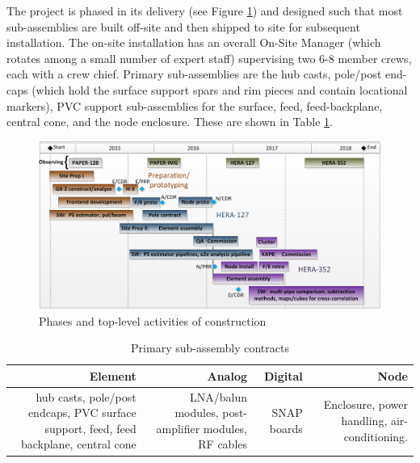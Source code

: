 \documentclass[preprint]{aastex}
\begin{document}
The project is phased in its delivery (see Figure \ref{fig:scheduleSummary}) and
designed such that most sub-assemblies are built off-site and then shipped to site
for subsequent installation. The on-site installation has an overall On-Site Manager
(which rotates among a small number of expert staff) supervising two 6-8 member
crews, each with a crew chief. Primary sub-assemblies are the hub casts, pole/post
end-caps (which hold the surface support spars and rim pieces and contain locational
markers), PVC support sub-assemblies for the surface, feed, feed-backplane, central
cone, and the node enclosure. These are shown in Table \ref{tab:subassycontracts}.

\begin{figure}[htb]
\centering
\includegraphics[width=\textwidth]{otherdocs/schedule.png}
\caption{\small Phases and top-level activities of construction}
\label{fig:scheduleSummary}
\end{figure}

\begin{table}[tbh]
\centering
\caption{Primary sub-assembly contracts} \label{tab:subassycontracts}
\begin{tabular}{| r{1.4in} | r{1.4in} | r{1.4in} | r{1.4in} |}\hline
\textbf{Element} & \textbf{Analog} & \textbf{Digital} & \textbf{Node} \tabularnewline \hline
hub casts, pole/post endcaps, PVC surface support, feed, feed backplane, central cone &
LNA/balun modules, post-amplifier modules, RF cables &
SNAP boards &
Enclosure, power handling, air-conditioning. \tabularnewline \hline
\end{tabular}
\end{table}
\end{document}
